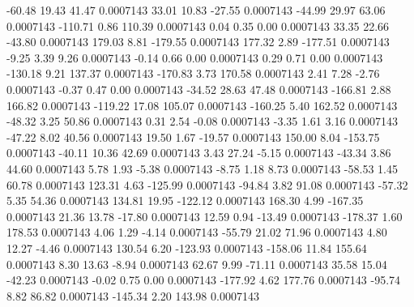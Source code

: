       -60.48       19.43       41.47     0.0007143
       33.01       10.83      -27.55     0.0007143
      -44.99       29.97       63.06     0.0007143
     -110.71        0.86      110.39     0.0007143
        0.04        0.35        0.00     0.0007143
       33.35       22.66      -43.80     0.0007143
      179.03        8.81     -179.55     0.0007143
      177.32        2.89     -177.51     0.0007143
       -9.25        3.39        9.26     0.0007143
       -0.14        0.66        0.00     0.0007143
        0.29        0.71        0.00     0.0007143
     -130.18        9.21      137.37     0.0007143
     -170.83        3.73      170.58     0.0007143
        2.41        7.28       -2.76     0.0007143
       -0.37        0.47        0.00     0.0007143
      -34.52       28.63       47.48     0.0007143
     -166.81        2.88      166.82     0.0007143
     -119.22       17.08      105.07     0.0007143
     -160.25        5.40      162.52     0.0007143
      -48.32        3.25       50.86     0.0007143
        0.31        2.54       -0.08     0.0007143
       -3.35        1.61        3.16     0.0007143
      -47.22        8.02       40.56     0.0007143
       19.50        1.67      -19.57     0.0007143
      150.00        8.04     -153.75     0.0007143
      -40.11       10.36       42.69     0.0007143
        3.43       27.24       -5.15     0.0007143
      -43.34        3.86       44.60     0.0007143
        5.78        1.93       -5.38     0.0007143
       -8.75        1.18        8.73     0.0007143
      -58.53        1.45       60.78     0.0007143
      123.31        4.63     -125.99     0.0007143
      -94.84        3.82       91.08     0.0007143
      -57.32        5.35       54.36     0.0007143
      134.81       19.95     -122.12     0.0007143
      168.30        4.99     -167.35     0.0007143
       21.36       13.78      -17.80     0.0007143
       12.59        0.94      -13.49     0.0007143
     -178.37        1.60      178.53     0.0007143
        4.06        1.29       -4.14     0.0007143
      -55.79       21.02       71.96     0.0007143
        4.80       12.27       -4.46     0.0007143
      130.54        6.20     -123.93     0.0007143
     -158.06       11.84      155.64     0.0007143
        8.30       13.63       -8.94     0.0007143
       62.67        9.99      -71.11     0.0007143
       35.58       15.04      -42.23     0.0007143
       -0.02        0.75        0.00     0.0007143
     -177.92        4.62      177.76     0.0007143
      -95.74        8.82       86.82     0.0007143
     -145.34        2.20      143.98     0.0007143
